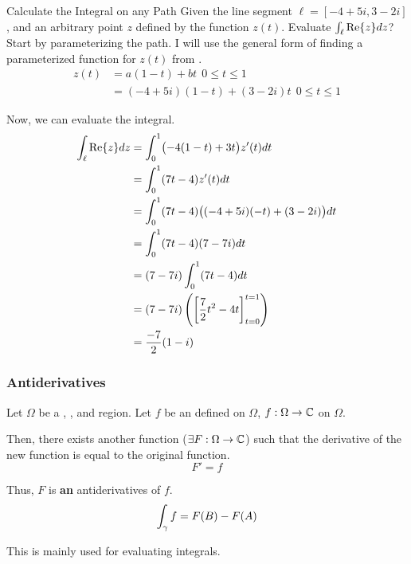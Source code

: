 \begin{example}[Lecture 7]{Calculate the Integral on any Path}
  Given the line segment $\ell = [-4+5i, 3-2i]$, and an arbitrary point $z$ defined by the function $z(t)$.
  Evaluate $\int_{\ell} \operatorname{Re} \lbrace z \rbrace dz$?
  \tcblower{}
  Start by parameterizing the path.
  I will use the general form of finding a parameterized function for $z(t)$ from .
  \begin{align*}
    z(t) &= a(1-t) + bt \:\: 0 \leq t \leq 1 \\
         &= (-4+5i)(1-t) + (3-2i)t \:\: 0 \leq t \leq 1
  \end{align*}

  Now, we can evaluate the integral.
  \begin{align*}
    \int_{\ell} \operatorname{Re} \lbrace z \rbrace dz &= \int_{0}^{1} \bigl( -4(1-t) + 3t \bigr) z'(t) dt \\
                            &= \int_{0}^{1} (7t - 4) z'(t) dt \\
                            &= \int_{0}^{1} (7t - 4) \bigl( (-4+5i)(-t) + (3-2i) \bigr) dt \\
                            &= \int_{0}^{1} (7t - 4) (7 - 7i) dt \\
                            &= (7-7i) \int_{0}^{1} (7t-4) dt \\
                            &= (7-7i) \left( {\left[ \frac{7}{2}t^{2}-4t \right]}_{t=0}^{t=1} \right) \\
                            &= \frac{-7}{2}(1-i)
  \end{align*}
\end{example}

\subsubsection{Antiderivatives}\label{subsubsec:Antiderivatives}
\begin{theorem}\label{thm:Complex_Antiderivative}
  Let $\Omega$ be a , , and  region.
  Let $f$ be an   defined on $\Omega$, $f: \Omega \to \operatorname{\mathbb{C}}$ on $\Omega$.

  Then, there exists another  function ($\exists F: \Omega \to \operatorname{\mathbb{C}}$) such that the derivative of the new function is equal to the original function.
  \begin{equation*}
    F' = f
  \end{equation*}

  Thus, $F$ is \textbf{an} antiderivatives of $f$.
  \begin{equation}\label{eq:Complex_Antiderivative}
    \int_{\gamma} f = F(B) - F(A)
  \end{equation}

  \begin{remark*}[Use]
    This is mainly used for evaluating integrals.
  \end{remark*}
\end{theorem}

